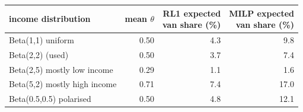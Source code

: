 \begin{tabular}{@{}lrrr@{}}
\toprule
income distribution & mean $\theta$ & \shortstack[r]{RL1 expected\\van share (\%)} & \shortstack[r]{MILP expected\\van share (\%)} \\
\midrule
Beta(1,1) uniform & 0.50 & 4.3 & 9.8 \\
Beta(2,2) (used) & 0.50 & 3.7 & 7.4 \\
Beta(2,5) mostly low income & 0.29 & 1.1 & 1.6 \\
Beta(5,2) mostly high income & 0.71 & 7.4 & 17.0 \\
Beta(0.5,0.5) polarised & 0.50 & 4.8 & 12.1 \\
\bottomrule
\end{tabular}
